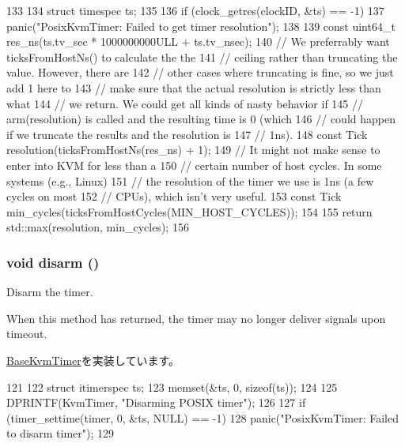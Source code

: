 \begin{DoxyCode}
133 {
134     struct timespec ts;
135 
136     if (clock_getres(clockID, &ts) == -1)
137         panic("PosixKvmTimer: Failed to get timer resolution\n");
138 
139     const uint64_t res_ns(ts.tv_sec * 1000000000ULL + ts.tv_nsec);
140     // We preferrably want ticksFromHostNs() to calculate the the
141     // ceiling rather than truncating the value. However, there are
142     // other cases where truncating is fine, so we just add 1 here to
143     // make sure that the actual resolution is strictly less than what
144     // we return. We could get all kinds of nasty behavior if
145     // arm(resolution) is called and the resulting time is 0 (which
146     // could happen if we truncate the results and the resolution is
147     // 1ns).
148     const Tick resolution(ticksFromHostNs(res_ns) + 1);
149     // It might not make sense to enter into KVM for less than a
150     // certain number of host cycles. In some systems (e.g., Linux)
151     // the resolution of the timer we use is 1ns (a few cycles on most
152     // CPUs), which isn't very useful.
153     const Tick min_cycles(ticksFromHostCycles(MIN_HOST_CYCLES));
154 
155     return std::max(resolution, min_cycles);
156 }
\end{DoxyCode}
\hypertarget{classPosixKvmTimer_a9882bfa120cede575461197f2a13cd8b}{
\subsubsection[{disarm}]{\setlength{\rightskip}{0pt plus 5cm}void disarm ()}}
\label{classPosixKvmTimer_a9882bfa120cede575461197f2a13cd8b}
Disarm the timer.

When this method has returned, the timer may no longer deliver signals upon timeout. 

\hyperlink{classBaseKvmTimer_aaef5c4bcad609bff2d6580c368020346}{BaseKvmTimer}を実装しています。


\begin{DoxyCode}
121 {
122     struct itimerspec ts;
123     memset(&ts, 0, sizeof(ts));
124 
125     DPRINTF(KvmTimer, "Disarming POSIX timer\n");
126 
127     if (timer_settime(timer, 0, &ts, NULL) == -1)
128         panic("PosixKvmTimer: Failed to disarm timer\n");
129 }
\end{DoxyCode}


